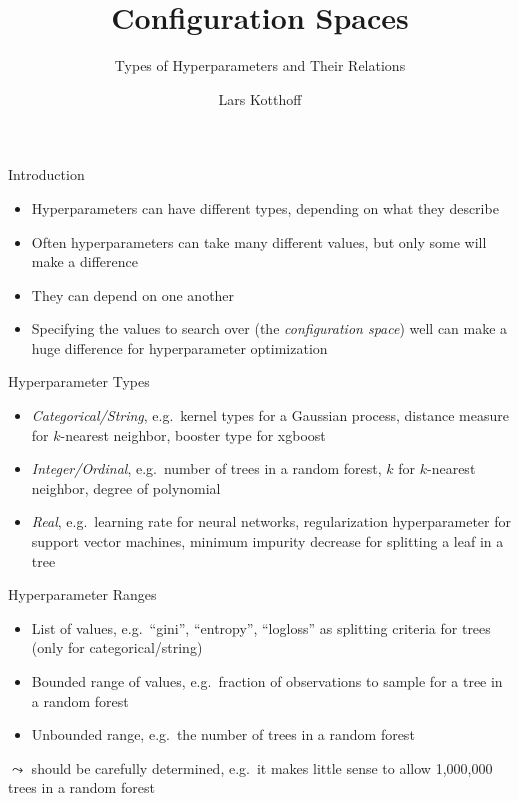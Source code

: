 \documentclass[main]{subfiles}
\begin{document}
\title[AutoML: HPO]{Configuration Spaces}
\subtitle{Types of Hyperparameters and Their Relations}
\author[Lars Kotthoff]{Lars Kotthoff}
\date{}


	\maketitle
	

\begin{frame}{Introduction}
    \begin{itemize}
        \item Hyperparameters can have different types, depending on what they describe
        \item Often hyperparameters can take many different values, but only some will make a difference
        \item They can depend on one another
        \item Specifying the values to search over (the \emph{configuration space}) well can make a huge difference for hyperparameter optimization
    \end{itemize}
\end{frame}


\begin{frame}{Hyperparameter Types}
    \begin{itemize}
        \item \emph{Categorical/String}, e.g.\ kernel types for a Gaussian process, distance measure for $k$-nearest neighbor, booster type for xgboost
        \item \emph{Integer/Ordinal}, e.g.\ number of trees in a random forest, $k$ for $k$-nearest neighbor, degree of polynomial
        \item \emph{Real}, e.g.\ learning rate for neural networks, regularization hyperparameter for support vector machines, minimum impurity decrease for splitting a leaf in a tree
    \end{itemize}
\end{frame}


\begin{frame}{Hyperparameter Ranges}
    \begin{itemize}
        \item List of values, e.g.\ ``gini'', ``entropy'', ``logloss'' as splitting criteria for trees (only for categorical/string)
        \item Bounded range of values, e.g.\ fraction of observations to sample for a tree in a random forest
        \item Unbounded range, e.g.\ the number of trees in a random forest
    \end{itemize}
    $\leadsto$ should be carefully determined, e.g.\ it makes little sense to allow 1,000,000 trees in a random forest
\end{frame}
\end{document}
